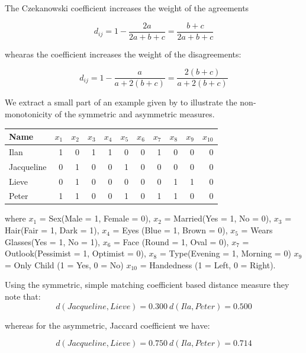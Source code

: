 The Czekanowski coefficient \citep{Dice:1945} increases the weight of the agreements

\begin{displaymath}
d_{ij} = 1 - \frac{2a}{2a + b + c} = \frac{b + c}{2a + b + c}
\end{displaymath}

whearas the \cite{Sokal+Sneath:1963} coefficient increases the weight of the disagreements:

\begin{displaymath}
d_{ij} = 1 - \frac{a}{a +2(b + c)} = \frac{2(b + c)}{a + 2(b + c)}
\end{displaymath}


We extract a small part of an example given by \cite{Kaufman+Rousseeuw:1989} to illustrate the non-monotonicity of the symmetric and asymmetric measures.

\begin{tabular}{l|rrrrrrrrrr}
Name & $x_{1}$ & $x_{2}$ & $x_{3}$ & $x_{4}$ & $x_{5}$ & $x_{6}$ & $x_{7}$ & $x_{8}$ & $x_{9}$ & $x_{10}$  \\
\hline
Ilan       & 1 & 0 & 1 & 1 & 0 & 0 & 1 & 0 & 0 & 0\\
Jacqueline & 0 & 1 & 0 & 0 & 1 & 0 & 0 & 0 & 0 & 0\\
Lieve      & 0 & 1 & 0 & 0 & 0 & 0 & 0 & 1 & 1 & 0\\
Peter      & 1 & 1 & 0 & 0 & 1 & 0 & 1 & 1 & 0 & 0\\
\end{tabular}

where $x_{1}$ = Sex(Male = 1, Female = 0), $x_{2}$ = Married(Yes = 1, No = 0), $x_{3}$ = Hair(Fair = 1, Dark = 1), $x_{4}$ = Eyes (Blue = 1, Brown = 0), $x_{5}$ = Wears Glasses(Yes = 1, No = 1), $x_{6}$ = Face (Round = 1, Oval = 0), $x_{7}$ = Outlook(Pessimist = 1, Optimist = 0), $x_{8}$ = Type(Evening = 1, Morning = 0) $x_{9}$ = Only Child (1 = Yes, 0 = No) $x_{10}$ = Handedness (1 = Left, 0 = Right).

Using the symmetric, simple matching coefficient based distance measure they note that:
\begin{displaymath}
d(Jacqueline, Lieve) = 0.300\ d(Ila, Peter) = 0.500
\end{displaymath}  

whereas for the asymmetric, Jaccard coefficient we have:

\begin{displaymath}
d(Jacqueline, Lieve) = 0.750\ d(Ila, Peter) = 0.714
\end{displaymath}  

